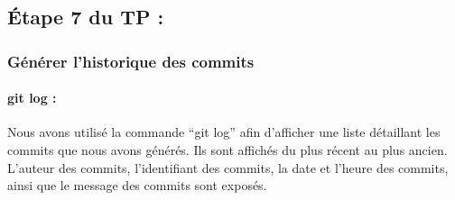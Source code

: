 \documentclass[
  letterpaper,
  DIV=11,
  numbers=noendperiod]{scrartcl}
\let\oldparagraph\paragraph
\renewcommand{\paragraph}[1]{\oldparagraph{#1}\mbox{}}
\begin{document}
\hypertarget{uxe9tape-7-du-tp}{%
\subsection{Étape 7 du TP :}\label{uxe9tape-7-du-tp}}

\hypertarget{guxe9nuxe9rer-lhistorique-des-commits}{%
\subsubsection{Générer l'historique des
commits}\label{guxe9nuxe9rer-lhistorique-des-commits}}

\hypertarget{git-log}{%
\paragraph{git log :}\label{git-log}}

Nous avons utilisé la commande ``git log'' afin d'afficher une liste
détaillant les commits que nous avons générés. Ils sont affichés du plus
récent au plus ancien. L'auteur des commits, l'identifiant des commits,
la date et l'heure des commits, ainsi que le message des commits sont
exposés.
\end{document}
